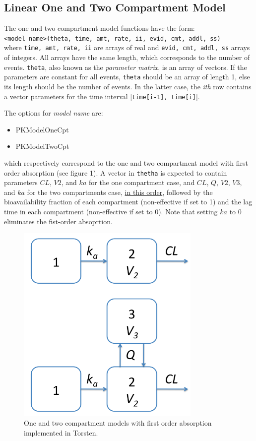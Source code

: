 \documentclass[11pt]{amsart}
\begin{document}
\subsection*{Linear One and Two Compartment Model}

The one and two compartment model functions have the form: \\

\texttt{<model name>(theta, time, amt, rate, ii, evid, cmt, addl, ss)} \\

where \texttt{time, amt, rate, ii} are arrays of real and \texttt{evid, cmt, addl, ss} arrays of integers. All arrays have the same length, which corresponds to the number of events. \texttt{theta}, also known as the \textit{parameter matrix}, is an array of vectors. If the parameters are constant for all events, \texttt{theta} should be an array of length 1, else its length should be the number of events. In the latter case, the \textit{ith} row contains a vector parameters for the time interval [\texttt{time[i-1], time[i]}].

The options for \textit{model name} are:
\begin{itemize}
  \item PKModelOneCpt
  \item PKModelTwoCpt
\end{itemize}
which respectively correspond to the one and two compartment model with first order absorption (see figure 1). A vector in \texttt{thetha} is expected to contain parameters $CL$, $V2$, and $ka$ for the one compartment case, and $CL$, $Q$, $V2$, $V3$, and $ka$ for the two compartments case, \underline{in this order}, followed by the bioavailability fraction of each compartment (non-effective if set to 1) and the lag time in each compartment (non-effective if set to 0). Note that setting $ka$ to 0 eliminates the fist-order absoprtion.

\begin{figure}[htbp]
\includegraphics[width=3.5in,trim=0in 0in 0 0in]{graphics/cptModels.png}
\caption{One and two compartment models with first order absorption implemented in Torsten.}
\label{cptModels}
\end{figure}
\end{document}
